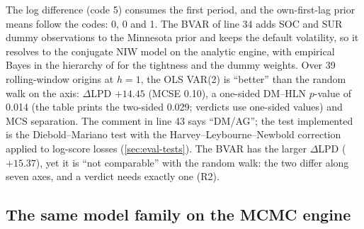 The log difference (code 5) consumes the first period, and the own-first-lag prior means follow
the codes: 0, 0 and 1.
The BVAR of line 34 adds SOC and SUR dummy observations to the Minnesota prior and keeps the
default volatility, so it resolves to the conjugate NIW model on the analytic engine, with
empirical Bayes in the hierarchy of \citet{giannone2015prior} for the tightness and the dummy
weights.
Over 39 rolling-window origins at $h = 1$, the OLS VAR(2) is ``better'' than the random walk on
the  axis: $\Delta$LPD $+14.45$ (MCSE 0.10), a one-sided DM--HLN $p$-value of 0.014
(the table prints the two-sided 0.029; verdicts use one-sided values) and MCS separation.
The comment in line 43 says ``DM/AG''; the test implemented is the Diebold--Mariano test with
the Harvey--Leybourne--Newbold correction applied to log-score losses (\cref{sec:eval-tests}).
The BVAR has the larger $\Delta$LPD ($+15.37$), yet it is ``not comparable'' with the random walk:
the two differ along seven axes, and a verdict needs exactly one (R2).

\subsection{The same model family on the MCMC engine}\label{sec:walk-mcmc}




